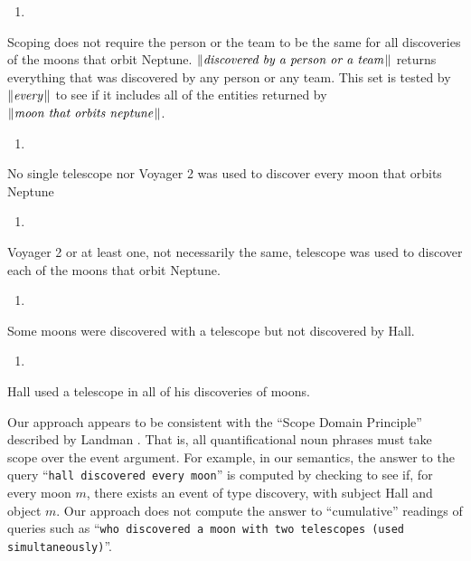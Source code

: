 \documentclass[../main.tex]{subfiles}
\begin{document}
\begin{refsection}
\begin{enumerate}[before=\small, label=\alph*.]
	\setlength\itemsep{0em}
	\setcounter{enumi}{2}
	\item {}
\end{enumerate}
\noindent Scoping does not require the person or the team to be the same for all discoveries of the moons that
orbit Neptune. $\lVert\textit{discovered by a person or a team\hspace{0.1em}}\rVert$ returns everything that was discovered by any
person or any team. This set is tested by $\lVert\textit{every\hspace{0.1em}}\rVert$ to see if it includes all of the entities returned by
$\lVert\textit{moon that orbits neptune\hspace{0.1em}}\rVert$.
\begin{enumerate}[before=\small, label=\alph*.]
	\setlength\itemsep{0em}
	\setcounter{enumi}{3}
	\item {}
\end{enumerate}
\noindent No single telescope nor Voyager 2 was used to discover every moon that orbits Neptune
\begin{enumerate}[before=\small, label=\alph*.]
	\setlength\itemsep{0em}
	\setcounter{enumi}{4}
	\item {}
\end{enumerate}
\noindent Voyager 2 or at least one, not necessarily the same, telescope was used to discover each of the moons
that orbit Neptune.
\begin{enumerate}[before=\small, label=\alph*.]
	\setlength\itemsep{0em}
	\setcounter{enumi}{5}
	\item {}
\end{enumerate}
\noindent  Some moons were discovered with a telescope but not discovered by Hall.
\begin{enumerate}[before=\small, label=\alph*.]
	\setlength\itemsep{0em}
	\setcounter{enumi}{6}
	\item {}
\end{enumerate}
\noindent Hall used a telescope in all of his discoveries of moons.

Our approach appears to be consistent with the ``Scope Domain Principle'' described by Landman \cite{landman1996plurality}. That is, all
quantificational noun phrases must take scope over the event argument. For example, in our semantics,
the answer to the query ``\texttt{hall discovered every moon}'' is computed by checking to see if, for every moon
$m$, there exists an event of type discovery, with subject Hall and object $m$. Our approach does not
compute the answer to ``cumulative'' readings of queries such as ``\texttt{who discovered a moon with two telescopes (used simultaneously)}''.


\end{refsection}
\end{document}
